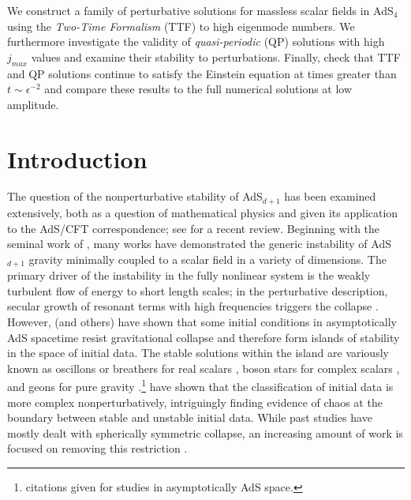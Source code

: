 \documentclass[../PhD.tex]{subfiles}
\begin{document}
\bigskip

We construct a family of perturbative solutions for massless scalar fields in AdS$_4$ using the \emph{Two-Time Formalism} (TTF) to high eigenmode numbers. We furthermore investigate the validity of \emph{quasi-periodic} (QP) solutions with high $j_{max}$ values and examine their stability to perturbations. Finally, check that TTF and QP solutions continue to satisfy the Einstein equation at times greater than $t \sim \epsilon^{-2}$ and compare these results to the full numerical solutions at low amplitude.


\section{Introduction}

The question of the nonperturbative stability of AdS$_{d+1}$ has been examined extensively, both as a question of mathematical physics and given its application to the AdS/CFT correspondence; see \cite{1708.05600} for a recent review. Beginning with the seminal work of \cite{1104.3702}, many works \cite{1108.4539, 1106.2339, 1110.5823, 1210.0890, 1510.02592} have demonstrated the generic instability of AdS$_{d+1}$ gravity minimally coupled to a scalar field in a variety of dimensions. The primary driver of the instability in the fully nonlinear system is the weakly turbulent flow of energy to short length scales; in the perturbative description, secular growth of resonant terms with high frequencies triggers the collapse \cite{1109.1825, 1306.0317, 1312.5544}. However, \cite{1303.3186, 1307.2875, 1403.5434} (and others) have shown that some initial conditions in asymptotically AdS spacetime resist gravitational collapse and therefore form islands of stability in the space of initial data.  The stable solutions within the island are variously known as oscillons or breathers for real scalars \cite{1104.3702,1210.0890,1303.3186,1503.07746}, boson stars for complex scalars \cite{1304.4166,1307.2875}, and geons for pure gravity \cite{1109.1825,1208.5772}.\footnote{citations given for studies in asymptotically AdS space.} \cite{1508.02709, 1711.00454,1602.03535} have shown that the classification of initial data is more complex nonperturbatively, intriguingly finding evidence of chaos at the boundary between stable and unstable initial data. While past studies have mostly dealt with spherically symmetric collapse, an increasing amount of work is focused on removing this restriction \cite{1602.03890,1705.03065, 1706.06101}.
\end{document}
